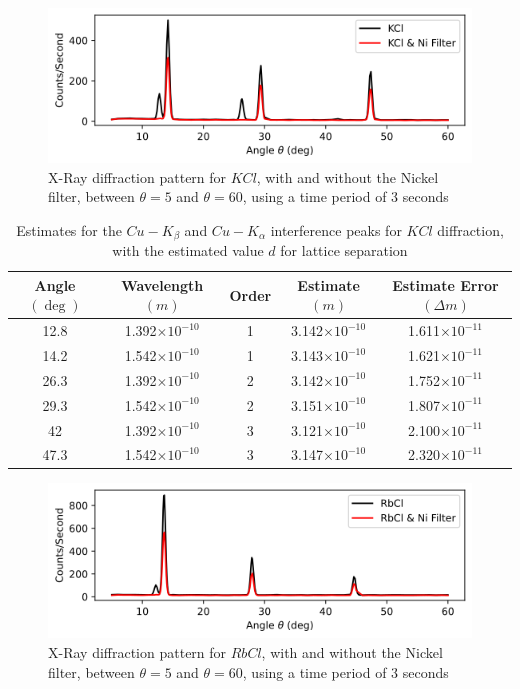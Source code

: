\documentclass[a4paper]{article}
\begin{document}
\begin{figure}[h!]
\centerline{\includegraphics[scale=0.8]{kcl.png}}
\caption{X-Ray diffraction pattern for $KCl$, with and without the Nickel filter, between $\theta=5$ and $\theta=60$, using a time period of 3 seconds}
\label{fig:kcl}
\end{figure}

\begin{table}[h!]
\centering
\begin{tabular}{ccccc}
\hline
Angle $(\deg)$ & Wavelength $(m)$ & Order & Estimate $(m)$ & Estimate Error $(\Delta m)$\\ \hline
12.8 & 1.392$\times10^{-10}$ & 1 & 3.142$\times10^{-10}$ & 1.611$\times10^{-11}$ \\
14.2 & 1.542$\times10^{-10}$ & 1 & 3.143$\times10^{-10}$ & 1.621$\times10^{-11}$ \\
26.3 & 1.392$\times10^{-10}$  & 2 & 3.142$\times10^{-10}$ & 1.752$\times10^{-11}$ \\
29.3 & 1.542$\times10^{-10}$ & 2 & 3.151$\times10^{-10}$ & 1.807$\times10^{-11}$ \\
42 & 1.392$\times10^{-10}$  & 3 & 3.121$\times10^{-10}$ & 2.100$\times10^{-11}$ \\
47.3 & 1.542$\times10^{-10}$ & 3 & 3.147$\times10^{-10}$ & 2.320$\times10^{-11}$ \\
\end{tabular}
\caption{\label{tab:kcltab}Estimates for the $Cu-K_\beta$ and $Cu-K_\alpha$ interference peaks for $KCl$ diffraction, with the estimated value $d$ for lattice separation}
\end{table}

\begin{figure}[h!]
\centerline{\includegraphics[scale=0.8]{rbcl.png}}
\caption{X-Ray diffraction pattern for $RbCl$, with and without the Nickel filter, between $\theta=5$ and $\theta=60$, using a time period of 3 seconds}
\label{fig:rbcl}
\end{figure}
\end{document}
